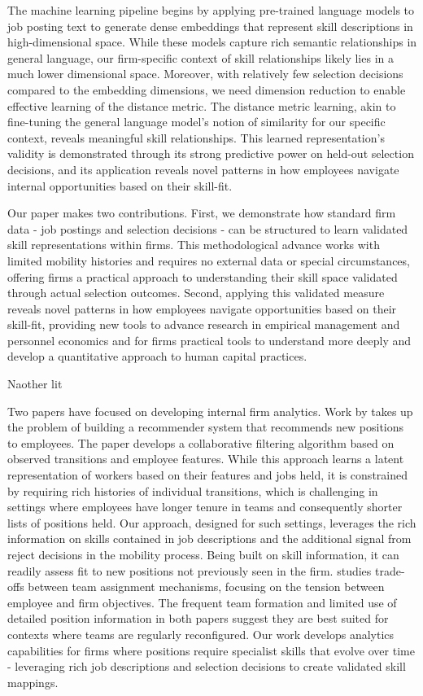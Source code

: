 \documentclass{article}
\begin{document}
The machine learning pipeline begins by applying pre-trained language models to job posting text to generate dense embeddings that represent skill descriptions in high-dimensional space. While these models capture rich semantic relationships in general language, our firm-specific context of skill relationships likely lies in a much lower dimensional space. Moreover, with relatively few selection decisions compared to the embedding dimensions, we need dimension reduction to enable effective learning of the distance metric. The distance metric learning, akin to fine-tuning the general language model's notion of similarity for our specific context, reveals meaningful skill relationships. This learned representation's validity is demonstrated through its strong predictive power on held-out selection decisions, and its application reveals novel patterns in how employees navigate internal opportunities based on their skill-fit.


Our paper makes two contributions. First, we demonstrate how standard firm data - job postings and selection decisions - can be structured to learn validated skill representations within firms. This methodological advance works with limited mobility histories and requires no external data or special circumstances, offering firms a practical approach to understanding their skill space validated through actual selection outcomes. Second, applying this validated measure reveals novel patterns in how employees navigate opportunities based on their skill-fit, providing new tools to advance research in empirical management and personnel economics and for firms practical tools to understand more deeply and develop a quantitative approach to human capital practices. 




Naother lit


Two papers have focused on developing internal firm analytics. Work by \textcite{devos2024data} takes up the problem of building a recommender system that recommends new positions to employees. The paper develops a collaborative filtering algorithm based on observed transitions and employee features. While this approach learns a latent representation of workers based on their features and jobs held, it is constrained by requiring rich histories of individual transitions, which is challenging in settings where employees have longer tenure in teams and consequently shorter lists of positions held. Our approach, designed for such settings, leverages the rich information on skills contained in job descriptions and the additional signal from reject decisions in the mobility process. Being built on skill information, it can readily assess fit to new positions not previously seen in the firm. \textcite{2024_Cowgill} studies trade-offs between team assignment mechanisms, focusing on the tension between employee and firm objectives. The frequent team formation and limited use of detailed position information in both papers suggest they are best suited for contexts where teams are regularly reconfigured. Our work develops analytics capabilities for firms where positions require specialist skills that evolve over time - leveraging rich job descriptions and selection decisions to create validated skill mappings.
\end{document}
